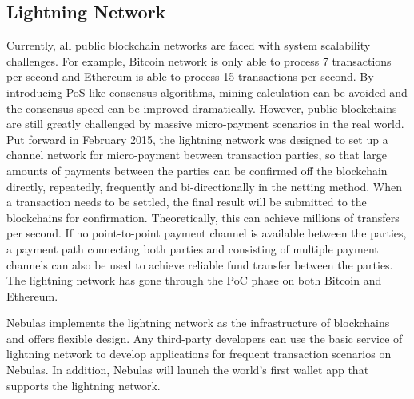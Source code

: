 \subsection{Lightning Network}

Currently, all public blockchain networks are faced with system scalability challenges. For example, Bitcoin network is only able to process 7 transactions per second and Ethereum is able to process 15 transactions per second. By introducing PoS-like consensus algorithms, mining calculation can be avoided and the consensus speed can be improved dramatically. However, public blockchains are still greatly challenged by massive micro-payment scenarios in the real world. Put forward in February 2015, the lightning network \cite{poon2015bitcoin} was designed to set up a channel network for micro-payment between transaction parties, so that large amounts of payments between the parties can be confirmed off the blockchain directly, repeatedly, frequently and bi-directionally in the netting method. When a transaction needs to be settled, the final result will be submitted to the blockchains for confirmation. Theoretically, this can achieve millions of transfers per second. If no point-to-point payment channel is available between the parties, a payment path connecting both parties and consisting of multiple payment channels can also be used to achieve reliable fund transfer between the parties. The lightning network has gone through the PoC phase on both Bitcoin and Ethereum. 


Nebulas implements the lightning network as the infrastructure of blockchains and offers flexible design. Any third-party developers can use the basic service of lightning network to develop applications for frequent transaction scenarios on Nebulas. In addition, Nebulas will launch the world's first wallet app that supports the lightning network.

